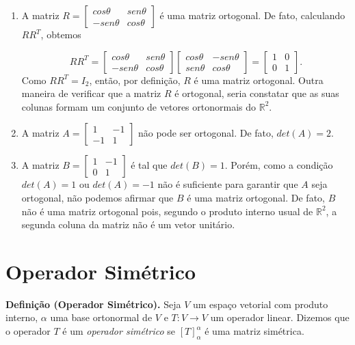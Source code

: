 \begin{enumerate}
\item A matriz  $R=\left[ \begin{array}{cc}cos\theta &sen\theta \\-sen\theta & cos\theta   \end{array} \right]$ é uma matriz ortogonal. De fato,  calculando $RR^T$, obtemos

$$RR^T=\left[ \begin{array}{cc}cos\theta &sen\theta \\-sen\theta & cos\theta   \end{array} \right]\left[ \begin{array}{cc}cos\theta &-sen\theta \\sen\theta & cos\theta   \end{array} \right]= \left[ \begin{array}{cc}1 & 0\\0 & 1   \end{array} \right].$$
Como $RR^T=I_2$, então, por definição, $R$ é uma matriz ortogonal. Outra maneira de verificar que a matriz $R$ é ortogonal,  seria constatar que as suas colunas  formam um conjunto de  vetores ortonormais do $\mathbb{R}^2$.

\item A matriz $A=\left[ \begin{array}{cc} 1 &-1\\-1& 1  \end{array} \right]$ não pode ser ortogonal. De fato, $det(A)=2$.

\item A matriz $B=\left[ \begin{array}{cc} 1 &-1\\0& 1  \end{array} \right]$  é tal que $det(B)=1$. Porém, como  a condição $det(A)= 1$ ou $det(A)=-1$ não é suficiente  para garantir que $A$ seja ortogonal, não podemos afirmar que $B$ é uma matriz ortogonal.  De fato,  $B$ não é  uma matriz ortogonal pois, segundo o produto interno usual de $\mathbb{R}^2$, a segunda coluna da matriz não é um vetor unitário.

\end{enumerate}

\section{Operador Simétrico}


\textbf{Definição (Operador Simétrico).} Seja $V$ um espaço vetorial com  produto interno,  $\alpha$  uma  base ortonormal de $V$  e $T: V \rightarrow V$  um operador linear. Dizemos que o operador  $T$ é um \textit{operador simétrico} se $[T]_{\alpha}^{\alpha}$ é uma matriz simétrica.


